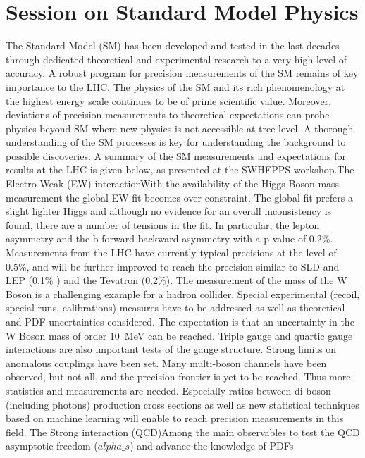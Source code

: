 \section{Session on Standard Model Physics}\label{standardmodel}


The Standard Model (SM) has been developed and tested in the last decades 
through dedicated theoretical and experimental research to a very high level of accuracy.
A robust program for precision measurements of the SM remains of key
importance to the LHC. The physics of the SM and its rich phenomenology
at the highest energy scale continues to be of prime scientific value.
Moreover, deviations of precision measurements to theoretical
expectations can probe physics beyond SM where new physics is not
accessible at tree-level. A thorough understanding of the SM processes
is key for understanding the background to possible discoveries. A
summary of the SM measurements and expectations for results at the LHC
is given below, as presented at the SWHEPPS workshop.The Electro-Weak
(EW) interactionWith the availability of the Higgs Boson mass
measurement the global EW fit becomes over-constraint. The global fit
prefers a slight lighter Higgs and although no evidence for an overall
inconsistency is found, there are a number of tensions in the fit. In
particular, the lepton asymmetry and the b forward backward asymmetry
with a p-value of 0.2\%. Measurements from the LHC have currently
typical precisions at the level of 0.5\%, and will be further improved
to reach the precision similar to SLD and LEP (0.1\% ) and the Tevatron
(0.2\%). The measurement of the mass of the W Boson is a challenging
example for a hadron collider. Special experimental (recoil, special
runs, calibrations) measures have to be addressed as well as theoretical
and PDF uncertainties considered. The expectation is that an uncertainty
in the W Boson mass of order 10~MeV can be reached. Triple gauge and
quartic gauge interactions are also important tests of the gauge
structure. Strong limits on anomalous couplings have been set. Many
multi-boson channels have been observed, but not all, and the precision
frontier is yet to be reached. Thus more statistics and measurements are
needed. Especially ratios between di-boson (including photons)
production cross sections as well as new statistical techniques based on
machine learning will enable to reach precision measurements in this
field. The Strong interaction (QCD)Among the main observables to test
the QCD asymptotic freedom ($alpha\_s$) and advance the knowledge of PDFs
